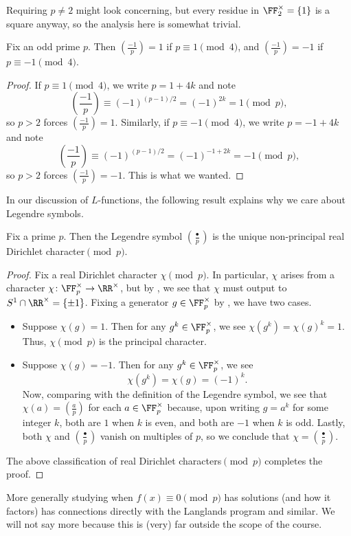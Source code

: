 \documentclass[../notes.tex]{subfiles}
\begin{document}
\begin{remark}
	Requiring $p\ne2$ might look concerning, but every residue in $\FF_2^\times=\{1\}$ is a square anyway, so the analysis here is somewhat trivial.
\end{remark}
\begin{corollary}
	Fix an odd prime $p$. Then $\left(\frac{-1}p\right)=1$ if $p\equiv1\pmod 4$, and $\left(\frac{-1}p\right)=-1$ if $p\equiv-1\pmod 4$.
\end{corollary}
\begin{proof}
	If $p\equiv1\pmod4$, we write $p=1+4k$ and note
	\[\left(\frac{-1}p\right)\equiv(-1)^{(p-1)/2}=(-1)^{2k}=1\pmod p,\]
	so $p>2$ forces $\left(\frac{-1}p\right)=1$. Similarly, if $p\equiv-1\pmod4$, we write $p=-1+4k$ and note
	\[\left(\frac{-1}p\right)\equiv(-1)^{(p-1)/2}=(-1)^{-1+2k}=-1\pmod p,\]
	so $p>2$ forces $\left(\frac{-1}p\right)=-1$. This is what we wanted.
\end{proof}
In our discussion of $L$-functions, the following result explains why we care about Legendre symbols.
\begin{proposition} \label{prop:legendre-is-character}
	Fix a prime $p$. Then the Legendre symbol $\left(\frac\bullet p\right)$ is the unique non-principal real Dirichlet character$\pmod p$.
\end{proposition}
\begin{proof}
	Fix a real Dirichlet character $\chi\pmod p$. In particular, $\chi$ arises from a character $\chi\colon\FF_p^\times\to\RR^\times$, but by , we see that $\chi$ must output to $S^1\cap\RR^\times=\{\pm1\}$. Fixing a generator $g\in\FF_p^\times$ by , we have two cases.
	\begin{itemize}
		\item Suppose $\chi(g)=1$. Then for any $g^k\in\FF_p^\times$, we see $\chi\left(g^k\right)=\chi(g)^k=1$. Thus, $\chi\pmod p$ is the principal character.
		\item Suppose $\chi(g)=-1$. Then for any $g^k\in\FF_p^\times$, we see
		\[\chi\left(g^k\right)=\chi(g)=(-1)^k.\]
		Now, comparing  with the definition of the Legendre symbol, we see that $\chi(a)=\left(\frac ap\right)$ for each $a\in\FF_p^\times$ because, upon writing $g=a^k$ for some integer $k$, both are $1$ when $k$ is even, and both are $-1$ when $k$ is odd. Lastly, both $\chi$ and $\left(\frac\bullet p\right)$ vanish on multiples of $p$, so we conclude that $\chi=\left(\frac\bullet p\right)$.
	\end{itemize}
	The above classification of real Dirichlet characters$\pmod p$ completes the proof.
\end{proof}
\begin{remark}
	More generally studying when $f(x)\equiv0\pmod p$ has solutions (and how it factors) has connections directly with the Langlands program and similar. We will not say more because this is (very) far outside the scope of the course.
\end{remark}
\end{document}
